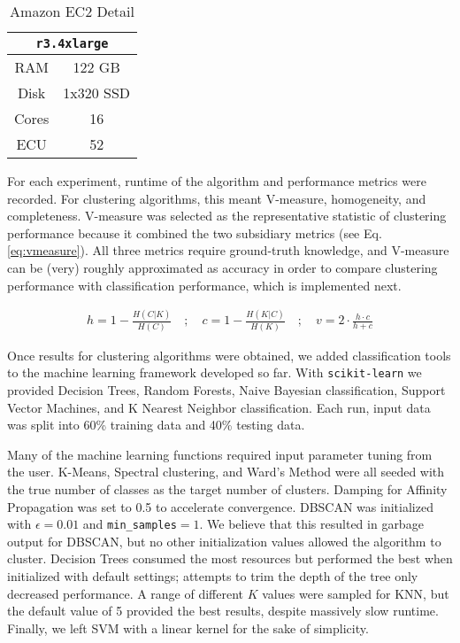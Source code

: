 \documentclass[letterpaper,10pt]{article}
\begin{document}
\begin{table}[ht]
\center
\begin{tabular}{cc}
\multicolumn{2}{c}{\texttt{r3.4xlarge}} \\
\hline
RAM & 122 GB \\
Disk & 1x320 SSD \\
Cores & 16 \\
ECU & 52 \\
\hline
\end{tabular}
\caption{Amazon EC2 Detail}
\label{tbl:ec2}
\end{table}


For each experiment, runtime of the algorithm and performance metrics were
recorded. For clustering algorithms, this meant V-measure, homogeneity, and
completeness.  V-measure was selected as the representative statistic of
clustering performance because it combined the two subsidiary metrics (see
Eq.  \ref{eq:vmeasure}). All three metrics require ground-truth knowledge,
and V-measure can be (very) roughly approximated as accuracy in order to
compare clustering performance with classification performance, which is
implemented next.


\begin{align}
h = 1 - \frac{H(C|K)}{H(C)}\quad;\quad
c = 1 - \frac{H(K|C)}{H(K)}\quad;\quad
v = 2 \cdot \frac{h \cdot c}{h + c}
\label{eq:vmeasure}
\end{align}


Once results for clustering algorithms were obtained, we added
classification tools to the machine learning framework developed so far.
With \texttt{scikit-learn} we provided Decision Trees, Random Forests,
Naive Bayesian classification, Support Vector Machines, and K Nearest
Neighbor classification. Each run, input data was split into 60\% training
data and 40\% testing data.


Many of the machine learning functions required input parameter tuning from
the user. K-Means, Spectral clustering, and Ward's Method were all seeded
with the true number of classes as the target number of clusters. Damping
for Affinity Propagation was set to 0.5 to accelerate convergence. DBSCAN
was initialized with $\epsilon=0.01$ and \texttt{min\_samples}$=1$. We
believe that this resulted in garbage output for DBSCAN, but no other
initialization values allowed the algorithm to cluster. Decision Trees
consumed the most resources but performed the best when initialized with
default settings; attempts to trim the depth of the tree only decreased
performance. A range of different $K$ values were sampled for KNN, but the
default value of 5 provided the best results, despite massively slow
runtime. Finally, we left SVM with a linear kernel for the sake of
simplicity.
\end{document}
